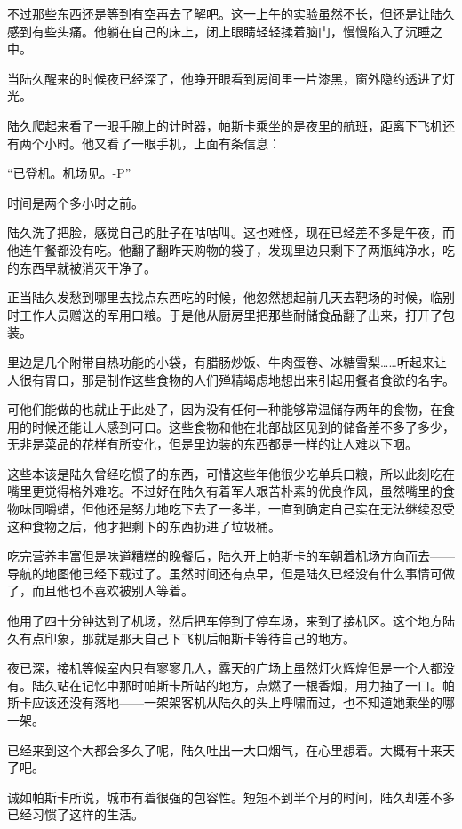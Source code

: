 不过那些东西还是等到有空再去了解吧。这一上午的实验虽然不长，但还是让陆久感到有些头痛。他躺在自己的床上，闭上眼睛轻轻揉着脑门，慢慢陷入了沉睡之中。

当陆久醒来的时候夜已经深了，他睁开眼看到房间里一片漆黑，窗外隐约透进了灯光。

陆久爬起来看了一眼手腕上的计时器，帕斯卡乘坐的是夜里的航班，距离下飞机还有两个小时。他又看了一眼手机，上面有条信息：

“已登机。机场见。-P”

时间是两个多小时之前。

陆久洗了把脸，感觉自己的肚子在咕咕叫。这也难怪，现在已经差不多是午夜，而他连午餐都没有吃。他翻了翻昨天购物的袋子，发现里边只剩下了两瓶纯净水，吃的东西早就被消灭干净了。

正当陆久发愁到哪里去找点东西吃的时候，他忽然想起前几天去靶场的时候，临别时工作人员赠送的军用口粮。于是他从厨房里把那些耐储食品翻了出来，打开了包装。

里边是几个附带自热功能的小袋，有腊肠炒饭、牛肉蛋卷、冰糖雪梨……听起来让人很有胃口，那是制作这些食物的人们殚精竭虑地想出来引起用餐者食欲的名字。

可他们能做的也就止于此处了，因为没有任何一种能够常温储存两年的食物，在食用的时候还能让人感到可口。这些食物和他在北部战区见到的储备差不多了多少，无非是菜品的花样有所变化，但是里边装的东西都是一样的让人难以下咽。

这些本该是陆久曾经吃惯了的东西，可惜这些年他很少吃单兵口粮，所以此刻吃在嘴里更觉得格外难吃。不过好在陆久有着军人艰苦朴素的优良作风，虽然嘴里的食物味同嚼蜡，但他还是努力地吃下去了一多半，一直到确定自己实在无法继续忍受这种食物之后，他才把剩下的东西扔进了垃圾桶。

吃完营养丰富但是味道糟糕的晚餐后，陆久开上帕斯卡的车朝着机场方向而去——导航的地图他已经下载过了。虽然时间还有点早，但是陆久已经没有什么事情可做了，而且他也不喜欢被别人等着。

他用了四十分钟达到了机场，然后把车停到了停车场，来到了接机区。这个地方陆久有点印象，那就是那天自己下飞机后帕斯卡等待自己的地方。

夜已深，接机等候室内只有寥寥几人，露天的广场上虽然灯火辉煌但是一个人都没有。陆久站在记忆中那时帕斯卡所站的地方，点燃了一根香烟，用力抽了一口。帕斯卡应该还没有落地——一架架客机从陆久的头上呼啸而过，也不知道她乘坐的哪一架。

已经来到这个大都会多久了呢，陆久吐出一大口烟气，在心里想着。大概有十来天了吧。

诚如帕斯卡所说，城市有着很强的包容性。短短不到半个月的时间，陆久却差不多已经习惯了这样的生活。

